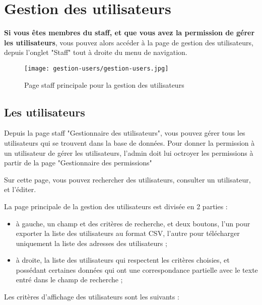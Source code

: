 \section{Gestion des utilisateurs}

\textbf{Si vous êtes membres du staff, et que vous avez la permission de gérer les utilisateurs}, vous pouvez alors accéder à la page de gestion des utilisateurs, depuis l'onglet "Staff" tout à droite du menu de navigation.

\begin{figure}[H]
\centering
\texttt{[image: gestion-users/gestion-users.jpg]}
\caption{Page staff principale pour la gestion des utilisateurs}
\end{figure}

\subsection{Les utilisateurs}

Depuis la page staff "Gestionnaire des utilisateurs", vous pouvez gérer tous les utilisateurs qui se trouvent dans la base de données. Pour donner la permission à un utilisateur de gérer les utilisateurs, l'admin doit lui octroyer les permissions à partir de la page "Gestionnaire des permissions"

\bigskip

Sur cette page, vous pouvez rechercher des utilisateurs, consulter un utilisateur, et l'éditer.\newline

La page principale de la gestion des utilisateurs est divisée en 2 parties :

\begin{itemize}
\item  à gauche, un champ et des critères de recherche, et deux boutons, l'un pour exporter la liste des utilisateurs au format CSV, l'autre pour télécharger uniquement la liste des adresses des utilisateurs ;
\item à droite, la liste des utilisateurs qui respectent les critères choisies, et possédant certaines données qui ont une correspondance partielle avec le texte entré dans le champ de recherche ;
\end{itemize}
\bigskip

Les critères d'affichage des utilisateurs sont les suivants :

